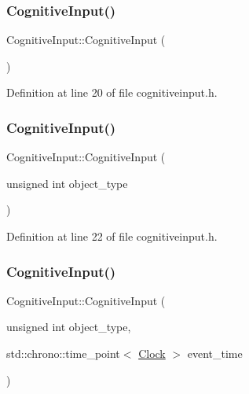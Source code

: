 \subsubsection{\texorpdfstring{Cognitive\+Input()}{CognitiveInput()}\hspace{0.1cm}{\footnotesize\ttfamily [1/4]}}
{\footnotesize\ttfamily Cognitive\+Input\+::\+Cognitive\+Input (\begin{DoxyParamCaption}{ }\end{DoxyParamCaption})\hspace{0.3cm}{\ttfamily [inline]}}



Definition at line 20 of file cognitiveinput.\+h.

\mbox{\label{class_cognitive_input_a220c07f5be517afe47b4d3c486c4152e}} 
\subsubsection{\texorpdfstring{Cognitive\+Input()}{CognitiveInput()}\hspace{0.1cm}{\footnotesize\ttfamily [2/4]}}
{\footnotesize\ttfamily Cognitive\+Input\+::\+Cognitive\+Input (\begin{DoxyParamCaption}\item[{unsigned int}]{object\+\_\+type }\end{DoxyParamCaption})\hspace{0.3cm}{\ttfamily [inline]}}



Definition at line 22 of file cognitiveinput.\+h.

\mbox{\label{class_cognitive_input_a31cc06426ab41c39ec8c795ab29d43de}} 
\subsubsection{\texorpdfstring{Cognitive\+Input()}{CognitiveInput()}\hspace{0.1cm}{\footnotesize\ttfamily [3/4]}}
{\footnotesize\ttfamily Cognitive\+Input\+::\+Cognitive\+Input (\begin{DoxyParamCaption}\item[{unsigned int}]{object\+\_\+type,  }\item[{std\+::chrono\+::time\+\_\+point$<$ \mbox{\hyperlink{universe_8h_a0ef8d951d1ca5ab3cfaf7ab4c7a6fd80}{Clock}} $>$}]{event\+\_\+time }\end{DoxyParamCaption})\hspace{0.3cm}{\ttfamily [inline]}}



